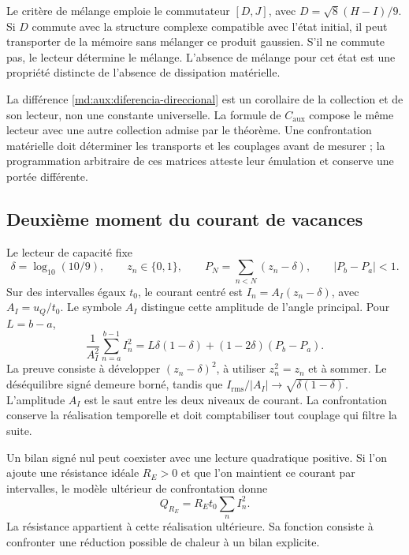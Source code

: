 Le critère de mélange emploie le commutateur $[D,J]$, avec
$D=\sqrt8(H-I)/9$. Si $D$ commute avec la structure complexe
compatible avec l’état initial, il peut transporter de la mémoire
sans mélanger ce produit gaussien. S’il ne commute pas, le lecteur
détermine le mélange. L’absence de mélange pour cet état
est une propriété distincte de l’absence de dissipation matérielle.

La différence \eqref{md:aux:diferencia-direccional} est un corollaire
de la collection et de son lecteur, non une constante universelle.
La formule de $C_{\mathrm{aux}}$ compose le même lecteur avec
une autre collection admise par le théorème. Une confrontation matérielle
doit déterminer les transports et les couplages avant de mesurer ;
la programmation arbitraire de ces matrices atteste leur
émulation et conserve une portée différente.

\subsection{Deuxième moment du courant de vacances}
\label{md:aux:vacancias}

Le lecteur de capacité fixe
\[
 \delta=\log_{10}(10/9),\qquad z_n\in\{0,1\},\qquad
 P_N=\sum_{n<N}(z_n-\delta),\qquad |P_b-P_a|<1.
\]
Sur des intervalles égaux $t_0$, le courant centré est
$I_n=A_I(z_n-\delta)$, avec $A_I=u_Q/t_0$.
Le symbole $A_I$ distingue cette amplitude de l’angle principal.
Pour $L=b-a$,
\begin{equation}
 \frac1{A_I^2}\sum_{n=a}^{b-1}I_n^2
 =L\delta(1-\delta)+(1-2\delta)(P_b-P_a).
 \label{md:aux:segundo-momento}
\end{equation}
La preuve consiste à développer $(z_n-\delta)^2$, à utiliser
$z_n^2=z_n$ et à sommer. Le déséquilibre signé demeure
borné, tandis que
$I_{\mathrm{rms}}/|A_I|\longrightarrow\sqrt{\delta(1-\delta)}$.
L’amplitude $A_I$ est le saut entre les deux niveaux de courant.
La confrontation conserve la réalisation temporelle et doit comptabiliser
tout couplage qui filtre la suite.

Un bilan signé nul peut coexister avec une lecture
quadratique positive. Si l’on ajoute une résistance idéale $R_E>0$
et que l’on maintient ce courant par intervalles, le modèle ultérieur
de confrontation donne
\begin{equation}
 Q_{R_E}=R_Et_0\sum_n I_n^2.
 \label{md:aux:contraste-resistivo}
\end{equation}
La résistance appartient à cette réalisation ultérieure. Sa
fonction consiste à confronter une réduction possible de chaleur
à un bilan explicite.

